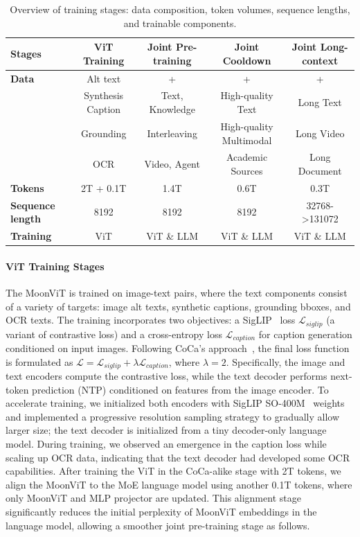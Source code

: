 \documentclass{article}
\newcommand{\citep}[1]{\parencite{#1}}
\begin{document}
\begin{table}[h]
\centering
\caption{Overview of training stages: data composition, token volumes, sequence lengths, and trainable components.}
\vspace{0.3em}
\begin{tabular}{lcccc}
\toprule
\textbf{Stages} & \textbf{ViT Training} & \textbf{Joint Pre-training} & \textbf{Joint Cooldown} & \textbf{Joint Long-context} \\
\midrule
\textbf{Data} & Alt text & + & + & + \\
 & Synthesis Caption & Text, Knowledge & High-quality Text & Long Text \\
 & Grounding & Interleaving & High-quality Multimodal & Long Video \\
 & OCR & Video, Agent & Academic Sources & Long Document \\
\midrule
\textbf{Tokens} & 2T + 0.1T & 1.4T & 0.6T & 0.3T \\
\midrule
\textbf{Sequence length} & 8192 & 8192 & 8192 & 32768->131072 \\
\midrule
\textbf{Training} & ViT & ViT \& LLM & ViT \& LLM& ViT \& LLM \\
\bottomrule
\end{tabular}
\label{tab:pretrainingdatavolume}
\end{table}

\paragraph{ViT Training Stages}


The MoonViT is trained on image-text pairs, where the text components consist of a variety of targets: image alt texts, synthetic captions, grounding bboxes, and OCR texts. The training incorporates two objectives: a SigLIP~\citep{zhai2023sigmoidlosslanguageimage} loss $\mathcal{L}_{siglip}$ (a variant of contrastive loss) and a cross-entropy loss $\mathcal{L}_{caption}$ for caption generation conditioned on input images. Following CoCa's approach~\citep{yu2022cocacontrastivecaptionersimagetext}, the final loss function is formulated as $\mathcal{L}=\mathcal{L}_{siglip}+\lambda\mathcal{L}_{caption}$, where $\lambda=2$. Specifically, the image and text encoders compute the contrastive loss, while the text decoder performs next-token prediction (NTP) conditioned on features from the image encoder. To accelerate training, we initialized both encoders with SigLIP SO-400M~\citep{zhai2023sigmoidlosslanguageimage} weights and implemented a progressive resolution sampling strategy to gradually allow larger size; the text decoder is initialized from a tiny decoder-only language model. During training, we observed an emergence in the caption loss while scaling up OCR data, indicating that the text decoder had developed some OCR capabilities. After training the ViT in the CoCa-alike stage with 2T tokens, we align the MoonViT to the MoE language model using another 0.1T tokens, where only MoonViT and MLP projector are updated. This alignment stage significantly reduces the initial perplexity of MoonViT embeddings in the language model, allowing a smoother joint pre-training stage as follows.
\end{document}
